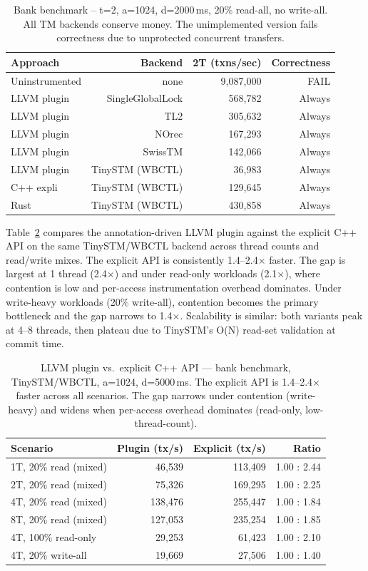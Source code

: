 \documentclass[article,12pt]{article}
\begin{document}
\begin{table}[h]
\centering
\begin{tabular}{lrrr}
\toprule
Approach & Backend & 2T (txns/sec) & Correctness \\
\midrule
Uninstrumented & none & 9,087,000 & FAIL \\
LLVM plugin & SingleGlobalLock & 568,782 & Always \\
LLVM plugin & TL2 & 305,632 & Always \\
LLVM plugin & NOrec & 167,293 & Always \\
LLVM plugin & SwissTM & 142,066 & Always \\
LLVM plugin & TinySTM (WBCTL) & 36,983 & Always \\
C++ expli & TinySTM (WBCTL) & 129,645 & Always \\
Rust & TinySTM (WBCTL) & 430,858 & Always \\
\bottomrule
\end{tabular}
\caption{Bank benchmark -- t=2, a=1024, d=2000\,ms, 20\% read-all, no write-all.
All TM backends conserve money.  The unimplemented version fails
correctness due to unprotected concurrent transfers.}
\label{tab:bank}
\end{table}

Table~\ref{tab:plugin-vs-explicit} compares the annotation-driven LLVM plugin
against the explicit C++ API on the same TinySTM/WBCTL backend across thread
counts and read/write mixes.  The explicit API is consistently 1.4--2.4$\times$
faster.  The gap is largest at 1 thread (2.4$\times$) and under read-only
workloads (2.1$\times$), where contention is low and per-access instrumentation
overhead dominates.  Under write-heavy workloads (20\% write-all), contention
becomes the primary bottleneck and the gap narrows to 1.4$\times$.  Scalability
is similar: both variants peak at 4--8 threads, then plateau due to TinySTM's
O(N) read-set validation at commit time.

\begin{table}[h]
\centering
\begin{tabular}{lrrr}
\toprule
Scenario & Plugin (tx/s) & Explicit (tx/s) & Ratio \\
\midrule
1T, 20\% read (mixed) & 46,539 & 113,409 & 1.00 : 2.44 \\
2T, 20\% read (mixed) & 75,326 & 169,295 & 1.00 : 2.25 \\
4T, 20\% read (mixed) & 138,476 & 255,447 & 1.00 : 1.84 \\
8T, 20\% read (mixed) & 127,053 & 235,254 & 1.00 : 1.85 \\
4T, 100\% read-only & 29,253 & 61,423 & 1.00 : 2.10 \\
4T, 20\% write-all & 19,669 & 27,506 & 1.00 : 1.40 \\
\bottomrule
\end{tabular}
\caption{LLVM plugin vs.\ explicit C++ API --- bank benchmark, TinySTM/WBCTL,
a=1024, d=5000\,ms.  The explicit API is 1.4--2.4$\times$ faster across all
scenarios.  The gap narrows under contention (write-heavy) and widens when
per-access overhead dominates (read-only, low-thread-count).}
\label{tab:plugin-vs-explicit}
\end{table}
\end{document}
